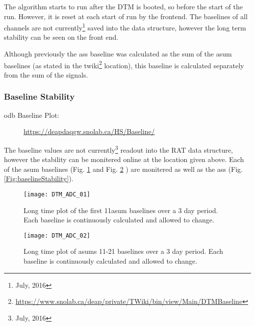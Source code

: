 		The algorithm starts to run after the DTM is booted, so before the start of the run. However, it is reset at each start of run by the frontend. The baselines of all channels are not currently\footnote{July, 2016} saved into the data structure, however the long term stability can be seen on the front end.
		
		Although previously the \gls{ass} baseline was calculated as the sum of the \gls{asum} baselines (as stated in the twiki\footnote{\url{https://www.snolab.ca/deap/private/TWiki/bin/view/Main/DTMBaseline}} location), this baseline is calculated separately from the sum of the signals.
		

		\subsubsection{Baseline Stability}
		\begin{description}
		\item[\gls{odb} Baseline Plot: ]\url{https://deapdaqgw.snolab.ca/HS/Baseline/}	
		\end{description}
		The baseline values are not currently\footnote{July, 2016} readout into the RAT data structure, however the stability can be monitered online at the location given above. Each of the \gls{asum} baselines (Fig. \ref{Fig:baselineStabilityAsum1}  and Fig. \ref{Fig:baselineStabilityAsum2} ) are monitered as well as the \gls{ass} (Fig. \ref{Fig:baselineStability}). 
		
		
		\begin{figure}[ht]
		\centering
		\texttt{[image: DTM\_ADC\_01]}
		\caption{Long time plot of the first 11\gls{asum} baselines over a 3 day period. Each baseline is continuously calculated and allowed to change.}
		\label{Fig:baselineStabilityAsum1}
		\end{figure}		
		
		\begin{figure}[ht]
		\centering
		\texttt{[image: DTM\_ADC\_02]}
		\caption{Long time plot of \gls{asum}s 11-21 baselines over a 3 day period. Each baseline is continuously calculated and allowed to change.}
		\label{Fig:baselineStabilityAsum2}
		\end{figure}
						
